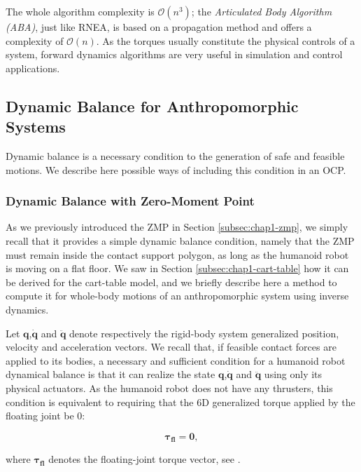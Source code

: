 \noindent The whole algorithm complexity is $\mathcal{O}(n^3)$; the
\emph{Articulated Body Algorithm (ABA)}, just like RNEA, is based on a
propagation method and offers a complexity of $\mathcal{O}(n)$. As the
torques usually constitute the physical controls of a system, forward
dynamics algorithms are very useful in simulation and control
applications.

\subsection{Dynamic Balance for Anthropomorphic Systems}

Dynamic balance is a necessary condition to the generation of safe and
feasible motions. We describe here possible ways of including this
condition in an OCP.

\subsubsection{Dynamic Balance with Zero-Moment Point}

As we previously introduced the ZMP in Section \ref{subsec:chap1-zmp},
we simply recall that it provides a simple dynamic balance condition,
namely that the ZMP must remain inside the contact support polygon, as
long as the humanoid robot is moving on a flat floor. We saw in
Section \ref{subsec:chap1-cart-table} how it can be derived for the
cart-table model, and we briefly describe here a method to compute it
for whole-body motions of an anthropomorphic system using inverse
dynamics.

Let $\mathbf{q}$,$\dot{\mathbf{q}}$ and $\ddot{\mathbf{q}}$ denote
respectively the rigid-body system generalized position, velocity and
acceleration vectors. We recall that, if feasible contact forces are
applied to its bodies, a necessary and sufficient condition for a
humanoid robot dynamical balance is that it can realize the state
$\mathbf{q}$,$\dot{\mathbf{q}}$ and $\ddot{\mathbf{q}}$ using only its
physical actuators. As the humanoid robot does not have any thrusters,
this condition is equivalent to requiring that the 6D generalized
torque applied by the floating joint be 0:

\begin{equation}
\label{eq:chap3-dynamic-balance-inverse}
 \boldsymbol{\tau_{fl}}=\mathbf{0},
\end{equation}

\noindent where $\boldsymbol{\tau_{fl}}$ denotes the floating-joint torque
vector, see \cite{hirukawa2006universal}.


